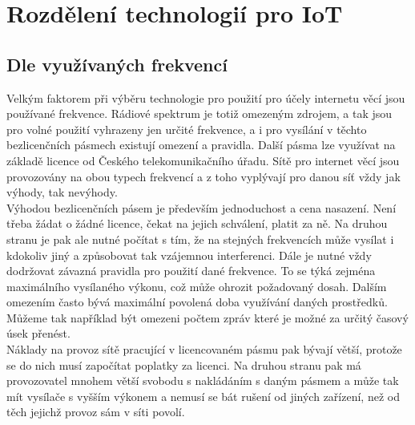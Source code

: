 \documentclass{ctuthesis}
\begin{document}
\section{Rozdělení technologií pro IoT}
\subsection{Dle využívaných frekvencí}
Velkým faktorem při výběru technologie pro použití pro účely internetu věcí jsou používané frekvence. Rádiové spektrum je totiž omezeným zdrojem, a tak jsou pro volné použití vyhrazeny jen určité frekvence, a i pro vysílání v těchto bezlicenčních pásmech existují omezení a pravidla. Další pásma lze využívat na základě licence od Českého telekomunikačního úřadu. Sítě pro internet věcí jsou provozovány na obou typech frekvencí a z toho vyplývají pro danou síť vždy jak výhody, tak nevýhody.\\
Výhodou bezlicenčních pásem je především jednoduchost a cena nasazení. Není třeba žádat o žádné licence, čekat na jejich schválení, platit za ně. Na druhou stranu je pak ale nutné počítat s tím, že na stejných frekvencích může vysílat i kdokoliv jiný a způsobovat tak vzájemnou interferenci. Dále je nutné vždy dodržovat závazná pravidla pro použití dané frekvence. To se týká zejména maximálního vysílaného výkonu, což může ohrozit požadovaný dosah. Dalším omezením často bývá maximální povolená doba využívání daných prostředků. Můžeme tak například být omezeni počtem zpráv které je možné za určitý časový úsek přenést.\\
Náklady na provoz sítě pracující v licencovaném pásmu pak bývají větší, protože se do nich musí započítat poplatky za licenci. Na druhou stranu pak má provozovatel mnohem větší svobodu s nakládáním s daným pásmem a může tak mít vysílače s vyšším výkonem a nemusí se bát rušení od jiných zařízení, než od těch jejichž provoz sám v síti povolí.
\end{document}
